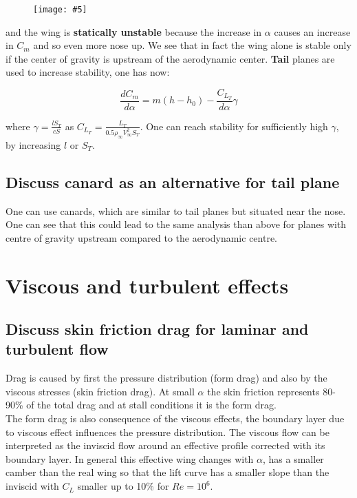 \documentclass[british,french,11pt, a4paper, openany]{article}
\newcommand{\wrapfig}[6]{%
	\begin{figure}%
		\vspace{-5mm}%
		\texttt{[image: \#5]}%
		\captionof{figure}{}%
		\label{#6}%
	\end{figure}%
}
\begin{document}
\wrapfig{5}{r}{5}{0.15}{ch5/14}{ch5/14}
and the wing is \textbf{statically unstable} because the increase in $\alpha$ causes an increase in $C_m$ and so even more nose up. We see that in fact the wing alone is stable only if the center of gravity is upstream of the aerodynamic center. 
\textbf{Tail} planes are used to increase stability, one has now: 

\begin{equation}
\frac{dC_m}{d\alpha} = m(h-h_0) - \frac{C_{L_T}}{d\alpha} \gamma 
\end{equation}

where $\gamma = \frac{l S_T}{cS}$ as $C_{L_T} = \frac{L_T}{0.5\rho _\infty V_\infty ^2 S_T}$. One can reach stability for sufficiently high $\gamma$, by increasing $l$ or $S_T$. 

\subsection{Discuss canard as an alternative for tail plane}
One can use canards, which are similar to tail planes but situated near the nose. One can see that this could lead to the same analysis than above for planes with centre of gravity upstream compared to the aerodynamic centre.


\section{Viscous and turbulent effects}
\subsection{Discuss skin friction drag for laminar and turbulent flow}

Drag is caused by first the pressure distribution (form drag) and also by the viscous stresses (skin friction drag). At small $\alpha$ the skin friction represents 80-90\% of the total drag and at stall conditions it is the form drag. \\

The form drag is also consequence of the viscous effects, the boundary layer due to viscous effect influences the pressure distribution. The viscous flow can be interpreted as the inviscid flow around an effective profile corrected with its boundary layer. In general this effective wing changes with $\alpha$, has a smaller camber than the real wing so that the lift curve has a smaller slope than the inviscid with $C_L$ smaller up to 10\%  for $Re = 10^6$. 	
\end{document}
